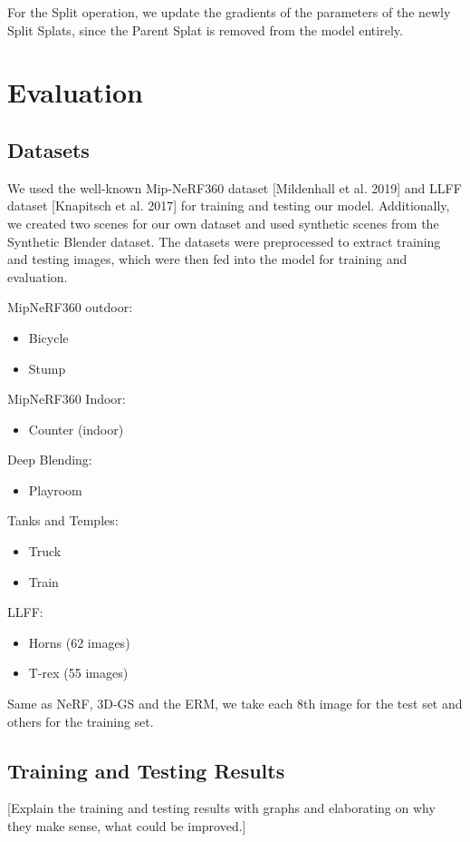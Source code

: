 \documentclass[11pt]{report}
\begin{document}
For the Split operation, we update the gradients of the parameters of the newly Split Splats, since the Parent Splat is removed from the model entirely.

\chapter{Evaluation}

\section{Datasets}
We used the well-known Mip-NeRF360 dataset [Mildenhall et al. 2019] and LLFF dataset [Knapitsch et al. 2017] for training and testing our model. Additionally, we created two scenes for our own dataset and used synthetic scenes from the Synthetic Blender dataset. The datasets were preprocessed to extract training and testing images, which were then fed into the model for training and evaluation.

MipNeRF360 outdoor:
\begin{itemize}
    \item Bicycle 
    \item Stump
\end{itemize}

MipNeRF360 Indoor:
\begin{itemize}
    \item Counter (indoor)
\end{itemize}

Deep Blending:
\begin{itemize}
    \item Playroom
\end{itemize}

Tanks and Temples:
\begin{itemize}
    \item Truck
    \item Train
\end{itemize}

LLFF:
\begin{itemize}
    \item Horns (62 images)
    \item T-rex (55 images)
\end{itemize}

Same as NeRF, 3D-GS and the ERM, we take each 8th image for the test set and others for the training set.

\section{Training and Testing Results}
[Explain the training and testing results with graphs and elaborating on why they make sense, what could be improved.]
\end{document}
